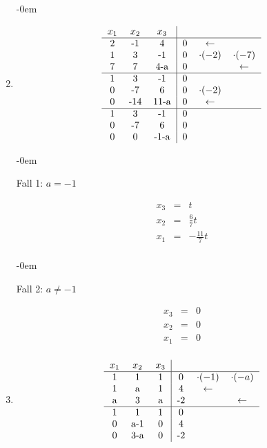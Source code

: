 				\begin{enumerate}\abovedisplayskip-0em
					\item
					
						\[
							\begin{tabular} {ccc|ccc}
								$x_1$ & $x_2$ & $x_3$ & & & \\
								\hline
								2 & -1 & 4 & 0 & $\leftarrow$ & \\
								1 & 3 & -1 & 0 & $\cdot(-2)$ & $\cdot(-7)$ \\
								7 & 7 & 4-a & 0 & & $\leftarrow$ \\
								\hline
								1 & 3 & -1 & 0 & & \\
								0 & -7 & 6 & 0 & $\cdot(-2)$ & \\
								0 & -14 & 11-a & 0 & $\leftarrow$ & \\
								\hline
								1 & 3 & -1 & 0 & & \\
								0 & -7 & 6 & 0 & & \\
								0 & 0 & -1-a & 0 & & \\
							\end{tabular}
						\]
						
						\abovedisplayskip-0em
						
						Fall 1: \emph{$a = -1$}
						
						\[
							\begin{array} {ccc}
								x_3 & = & t\\
								x_2 & = & \frac{6}{7}t\\
								x_1 & = & -\frac{11}{7}t\\
							\end{array}
						\]
						
						\abovedisplayskip-0em
						
						Fall 2: \emph{$a \neq -1$}
						
						\[
							\begin{array} {ccc}
								x_3 & = & 0\\
								x_2 & = & 0\\
								x_1 & = & 0\\
							\end{array}
						\]
							
					\item
						
						\[
							\begin{tabular} {ccc|ccc}
								$x_1$ & $x_2$ & $x_3$ & & & \\
								\hline
								1 & 1 & 1 & 0 & $\cdot(-1)$ & $\cdot(-a)$ \\
								1 & a & 1 & 4 & $\leftarrow$ & \\
								a & 3 & a & -2 & & $\leftarrow$ \\
								\hline
								1 & 1 & 1 & 0 & & \\
								0 & a-1 & 0 & 4 & & \\
								0 & 3-a & 0 & -2 & & \\
							\end{tabular}
						\]
						

\end{enumerate}
